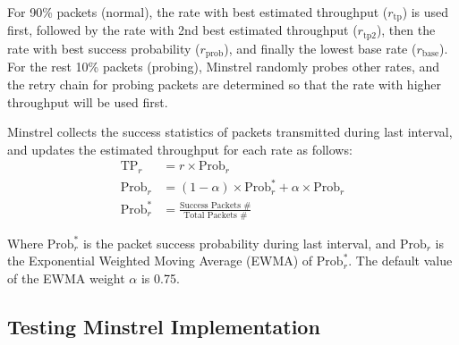 For 90\% packets (normal), the rate with best estimated throughput
($r_{\text{tp}}$) is used first, followed by the rate with 2nd best estimated
throughput ($r_{\text{tp2}}$), then the rate with best success probability
($r_{\text{prob}}$), and finally the lowest base rate ($r_{\text{base}}$). For
the rest 10\% packets (probing), Minstrel randomly probes other rates, and the
retry chain for probing packets are determined so that the rate with higher
throughput will be used first.

Minstrel collects the success statistics of packets transmitted during last
interval, and updates the estimated throughput for each rate as follows:
\begin{align}
  \text{TP}_{r} &= r \times \text{Prob}_r\\
  \text{Prob}_{r} &= (1-\alpha)\times\text{Prob}^*_{r} + \alpha\times\text{Prob}_r\\
  \text{Prob}^*_r &= \frac{\text{Success Packets \#}}{\text{Total Packets \#}}
\end{align}

Where $\text{Prob}^*_{r}$ is the packet success probability during last
interval, and $\text{Prob}_{r}$ is the Exponential Weighted Moving Average
(EWMA) of $\text{Prob}^*_{r}$. The default value of the EWMA weight $\alpha$ is
0.75.

\subsection{Testing Minstrel Implementation}
